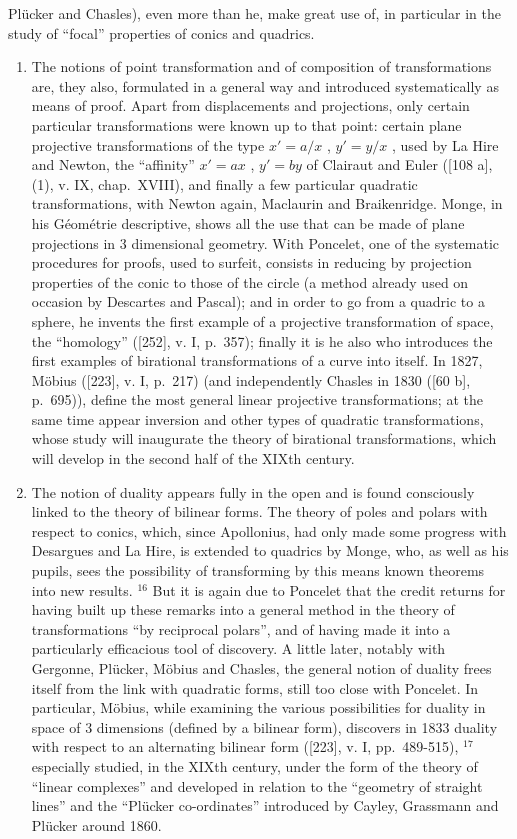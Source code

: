 Plücker and Chasles), even more than he, make great use of, in particular in the study of ``focal'' properties of conics and quadrics.

\begin{enumerate}
\def\labelenumi{\Alph{enumi})}
\setcounter{enumi}{2}
\item
  The notions of point transformation and of composition of transformations are, they also, formulated in a general way and introduced systematically as means of proof. Apart from displacements and projections, only certain particular transformations were known up to that point: certain plane projective transformations of the type \(x' = a / x\) , \(y' = y / x\) , used by La Hire and Newton, the ``affinity'' \(x' = ax\) , \(y' = by\) of Clairaut and Euler ({[}108 a{]}, (1), v. IX, chap.~XVIII), and finally a few particular quadratic transformations, with Newton again, Maclaurin and Braikenridge. Monge, in his Géométrie descriptive, shows all the use that can be made of plane projections in 3 dimensional geometry. With Poncelet, one of the systematic procedures for proofs, used to surfeit, consists in reducing by projection properties of the conic to those of the circle (a method already used on occasion by Descartes and Pascal); and in order to go from a quadric to a sphere, he invents the first example of a projective transformation of space, the ``homology'' ({[}252{]}, v. I, p.~357); finally it is he also who introduces the first examples of birational transformations of a curve into itself. In 1827, Möbius ({[}223{]}, v. I, p.~217) (and independently Chasles in 1830 ({[}60 b{]}, p.~695)), define the most general linear projective transformations; at the same time appear inversion and other types of quadratic transformations, whose study will inaugurate the theory of birational transformations, which will develop in the second half of the XIXth century.
\item
  The notion of duality appears fully in the open and is found consciously linked to the theory of bilinear forms. The theory of poles and polars with respect to conics, which, since Apollonius, had only made some progress with Desargues and La Hire, is extended to quadrics by Monge, who, as well as his pupils, sees the possibility of transforming by this means known theorems into new results. \(^{16}\) But it is again due to Poncelet that the credit returns for having built up these remarks into a general method in the theory of transformations ``by reciprocal polars'', and of having made it into a particularly efficacious tool of discovery. A little later, notably with Gergonne, Plücker, Möbius and Chasles, the general notion of duality frees itself from the link with quadratic forms, still too close with Poncelet. In particular, Möbius, while examining the various possibilities for duality in space of 3 dimensions (defined by a bilinear form), discovers in 1833 duality with respect to an alternating bilinear form ({[}223{]}, v. I, pp.~489-515), \(^{17}\) especially studied, in the XIXth century, under the form of the theory of ``linear complexes'' and developed in relation to the ``geometry of straight lines'' and the ``Plücker co-ordinates'' introduced by Cayley, Grassmann and Plücker around 1860.

\end{enumerate}
